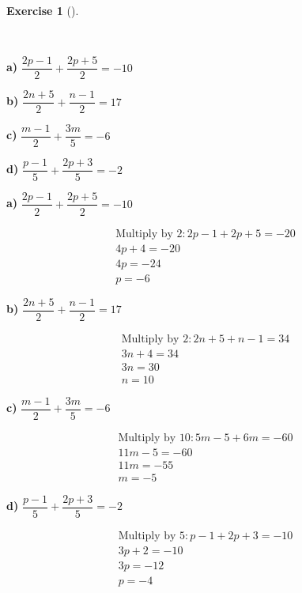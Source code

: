 \documentclass[
  letterpaper,
  DIV=11,
  numbers=noendperiod]{scrreprt}
\theoremstyle{definition}
\newtheorem{exercise}{Exercise}[chapter]
\theoremstyle{remark}
\begin{document}
\begin{exercise}[]\protect\hypertarget{exr-u5-15}{}\label{exr-u5-15}

~

\textbf{a)}
\(\displaystyle \dfrac{2p - 1}{2} + \dfrac{2p + 5}{2} = -10\)

\textbf{b)} \(\displaystyle \dfrac{2n + 5}{2} + \dfrac{n - 1}{2} = 17\)

\textbf{c)} \(\displaystyle \dfrac{m - 1}{2} + \dfrac{3m}{5} = -6\)

\textbf{d)} \(\displaystyle \dfrac{p - 1}{5} + \dfrac{2p + 3}{5} = -2\)

\begin{tcolorbox}[enhanced jigsaw, opacitybacktitle=0.6, coltitle=black, arc=.35mm, colframe=quarto-callout-tip-color-frame, colback=white, bottomrule=.15mm, left=2mm, colbacktitle=quarto-callout-tip-color!10!white, titlerule=0mm, opacityback=0, title=\textcolor{quarto-callout-tip-color}{\faLightbulb}\hspace{0.5em}{🔍 View Solutions}, leftrule=.75mm, breakable, rightrule=.15mm, bottomtitle=1mm, toptitle=1mm, toprule=.15mm]

\textbf{a)}
\(\displaystyle \dfrac{2p - 1}{2} + \dfrac{2p + 5}{2} = -10\)

\begin{align*}
\text{Multiply by }2: 2p - 1 + 2p + 5 = -20 \\ 4p + 4 = -20 \\ 4p = -24 \\ p = -6
\end{align*}

\textbf{b)} \(\displaystyle \dfrac{2n + 5}{2} + \dfrac{n - 1}{2} = 17\)

\begin{align*}
\text{Multiply by }2: 2n + 5 + n - 1 = 34 \\ 3n + 4 = 34 \\ 3n = 30 \\ n = 10
\end{align*}

\textbf{c)} \(\displaystyle \dfrac{m - 1}{2} + \dfrac{3m}{5} = -6\)

\begin{align*}
\text{Multiply by }10: 5m - 5 + 6m = -60 \\ 11m - 5 = -60 \\ 11m = -55 \\ m = -5
\end{align*}

\textbf{d)} \(\displaystyle \dfrac{p - 1}{5} + \dfrac{2p + 3}{5} = -2\)

\begin{align*}
\text{Multiply by }5: p - 1 + 2p + 3 = -10 \\ 3p + 2 = -10 \\ 3p = -12 \\ p = -4
\end{align*}

\end{tcolorbox}

\end{exercise}
\end{document}
